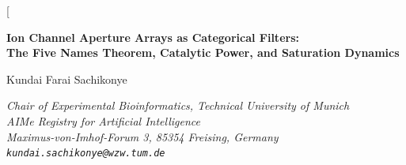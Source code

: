 \documentclass[11pt,twocolumn,a4paper]{article}
\theoremstyle{definition}
\theoremstyle{remark}
\begin{document}
\twocolumn[
\begin{@twocolumnfalse}
\begin{center}

{\LARGE\bfseries Ion Channel Aperture Arrays as Categorical Filters:\\[4pt]
The Five Names Theorem, Catalytic Power, and Saturation Dynamics}

\vspace{12pt}

{\large Kundai Farai Sachikonye}

\vspace{6pt}

{\small\itshape Chair of Experimental Bioinformatics, Technical University of Munich \\[0.3em]
\small\itshape AIMe Registry for Artificial Intelligence \\[0.2em]
\small\itshape Maximus-von-Imhof-Forum 3, 85354 Freising, Germany \\[0.2em]
\texttt{kundai.sachikonye@wzw.tum.de}}

\vspace{6pt}{\small May 2026}

\vspace{16pt}


\end{center}
\end{@twocolumnfalse}
\end{document}
